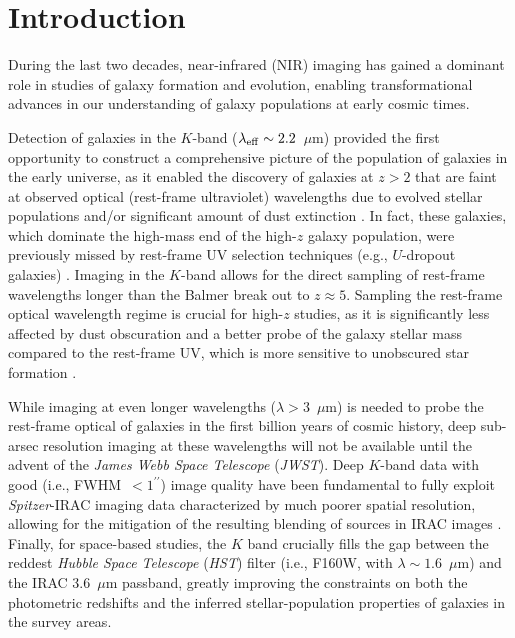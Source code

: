 \documentclass[preprint2]{aastex6}
\gdef\arcsec{^{\prime\prime}}
\begin{document}

\section{Introduction}
\label{s:introduction}

During the last two decades, near-infrared (NIR) imaging has gained a dominant role in studies of galaxy formation and evolution, enabling transformational advances in our understanding of galaxy populations at early cosmic times.

Detection of galaxies in the $K$-band ($\lambda_{\rm eff} \sim 2.2$~$\mu$m) provided the first opportunity to construct a comprehensive picture of the population of galaxies in the early universe, as it enabled the discovery of galaxies at $z > 2$ that are faint at observed optical (rest-frame ultraviolet) wavelengths due to evolved stellar populations and/or significant amount of dust extinction \citep[e.g.,][]{franx:03, labbe:03, forster:04, minowa:05, kajisawa:06, brammer:07, taylor:09a}. In fact, these galaxies, which dominate the high-mass end of the high-$z$ galaxy population, were previously missed by rest-frame UV selection techniques (e.g., $U$-dropout galaxies) \citep[e.g.,][]{vandokkum:06}. Imaging in the $K$-band allows for the direct sampling of rest-frame wavelengths longer than the Balmer break out to $z\approx5$. Sampling the rest-frame optical wavelength regime is crucial for high-$z$ studies, as it is significantly less affected by dust obscuration and a better probe of the galaxy stellar mass compared to the rest-frame UV, which is more sensitive to unobscured star formation \citep[e.g., ][]{fontana:06, marchesini:09}. 

While imaging at even longer wavelengths ($\lambda>3$~$\mu$m) is needed to probe the rest-frame optical of galaxies in the first billion years of cosmic history, deep sub-arsec resolution imaging at these wavelengths will not be available until the advent of the {\it James Webb Space Telescope} ({\it JWST}). Deep $K$-band data with good  (i.e., FWHM~$<1\arcsec$) image quality have been fundamental to fully exploit {\it Spitzer}-IRAC imaging data characterized by much poorer spatial resolution, allowing for the mitigation of the resulting blending of sources in IRAC images \citep[e.g.,][]{labbe:05}. Finally, for space-based studies, the $K$ band crucially fills the gap between the reddest {\it Hubble Space Telescope} ({\it HST}) filter (i.e., F160W, with $\lambda \sim 1.6$~$\mu$m) and the IRAC 3.6~$\mu$m passband, greatly improving the constraints on both the photometric redshifts and the inferred stellar-population properties of galaxies in the survey areas. 
\end{document}
